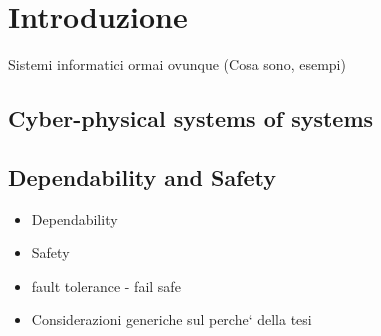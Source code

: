 \chapter{Introduzione}

Sistemi informatici ormai ovunque (Cosa sono, esempi)

\section{Cyber-physical systems of systems}

\section{Dependability and Safety}

\begin{itemize}
	\item Dependability
	\item Safety
	\item fault tolerance - fail safe
	\item Considerazioni generiche sul perche` della tesi
\end{itemize}
